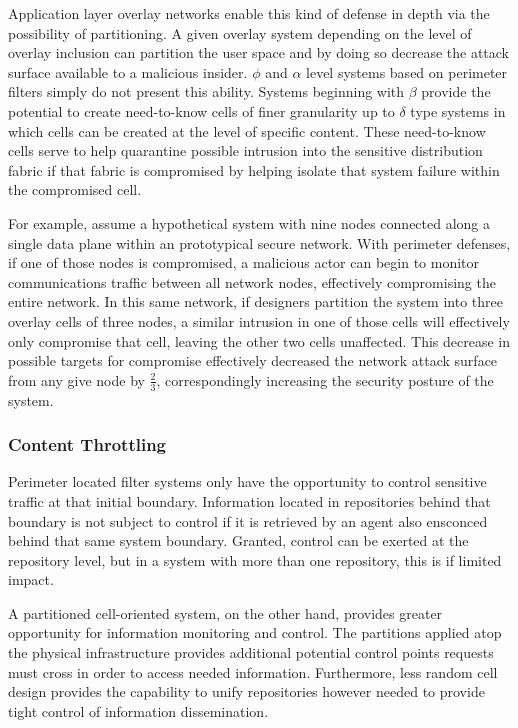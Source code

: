 Application layer overlay networks enable this kind of defense in depth via the possibility of partitioning.  A given overlay system depending on the level of overlay inclusion can partition the user space and by doing so decrease the attack surface available to a malicious insider.  $\phi$ and $\alpha$ level systems based on perimeter filters simply do not present this ability.  Systems beginning with $\beta$ provide the potential to create need-to-know cells of finer granularity up to $\delta$ type systems in which cells can be created at the level of specific content.  These need-to-know cells serve to help quarantine possible intrusion into the sensitive distribution fabric if that fabric is compromised by helping isolate that system failure within the compromised cell.

For example, assume a hypothetical system with nine nodes connected along a single data plane within an prototypical secure network.  With perimeter defenses, if one of those nodes is compromised, a malicious actor can begin to monitor communications traffic between all network nodes, effectively compromising the entire network.  In this same network, if designers partition the system into three overlay cells of three nodes, a similar intrusion in one of those cells will effectively only compromise that cell, leaving the other two cells unaffected.  This decrease in possible targets for compromise effectively decreased the network attack surface from any give node by $\frac{2}{3}$, correspondingly increasing the security posture of the system.

\subsubsection*{Content Throttling}
Perimeter located filter systems only have the opportunity to control sensitive traffic at that initial boundary.  Information located in repositories behind that boundary is not subject to control if it is retrieved by an agent also ensconced behind that same system boundary.  Granted, control can be exerted at the repository level, but in a system with more than one repository, this is if limited impact.

A partitioned cell-oriented system, on the other hand, provides greater opportunity for information monitoring and control.  The partitions applied atop the physical infrastructure provides additional potential control points requests must cross in order to access needed information.  Furthermore, less random cell design provides the capability to unify repositories however needed to provide tight control of information dissemination.

